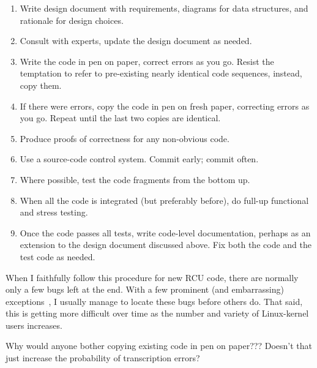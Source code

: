 \begin{enumerate}
\item	Write design document with requirements, diagrams for data structures,
	and rationale for design choices.
\item	Consult with experts, update the design document as needed.
\item	Write the code in pen on paper, correct errors as you go.
	Resist the temptation to refer to pre-existing nearly identical code
	sequences, instead, copy them.
\item	If there were errors, copy the code in pen on fresh paper, correcting
	errors as you go.
	Repeat until the last two copies are identical.
\item	Produce proofs of correctness for any non-obvious code.
\item	Use a source-code control system.
	Commit early; commit often.
\item	Where possible, test the code fragments from the bottom up.
\item	When all the code is integrated (but preferably before),
	do full-up functional and stress testing.
\item	Once the code passes all tests, write code-level documentation,
	perhaps as an extension to the design document discussed above.
	Fix both the code and the test code as needed.
\end{enumerate}

When I faithfully follow this procedure for new RCU code, there are
normally only a few bugs left at the end.
With a few prominent (and embarrassing)
exceptions~\cite{PaulEMcKenney2011RCU3.0trainwreck},
I usually manage to locate these bugs before others do.
That said, this is getting more difficult over time as the number and
variety of Linux-kernel users increases.

\QuickQuiz{}
	Why would anyone bother copying existing code in pen on paper???
	Doesn't that just increase the probability of transcription errors?
 \QuickQuizEnd

